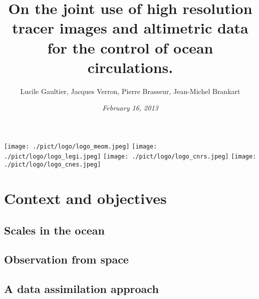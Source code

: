 \documentclass[compress,slidescentered,notes=show]{beamer}
\title{On the joint use of high resolution tracer images \hspace{4cm} and altimetric data for the control of ocean circulations.}
\author[LPO]{Lucile Gaultier, Jacques Verron, Pierre Brasseur, Jean-Michel Brankart}
\date{\textit{February 16, 2013}}
\begin{document}
\begin{frame}
  \maketitle
{}
  \begin{center}
    \texttt{[image: ./pict/logo/logo\_meom.jpeg]}
    \hspace{0.5cm}
    \texttt{[image: ./pict/logo/logo\_legi.jpeg]}
    \hspace{0.5cm}
    \texttt{[image: ./pict/logo/logo\_cnrs.jpeg]}
    \hspace{0.5cm}
    \texttt{[image: ./pict/logo/logo\_cnes.jpeg]}
  \end{center}

  \note{
}
\end{frame}

\logo{\insertframenumber/\inserttotalframenumber}

\section{Context and objectives}
        \subsection{Scales in the ocean}
\begin{frame}

\end{frame}

	\subsection[Observation]{Observation from space}
\begin{frame}
\end{frame}

	\subsection{A data assimilation approach}
\begin{frame}
\end{frame}
\end{document}
